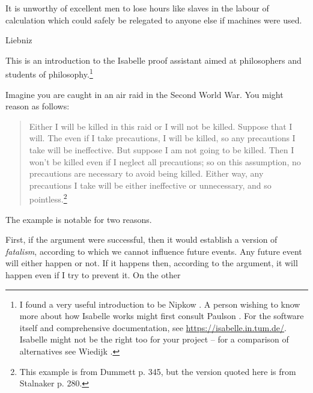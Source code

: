 %
\begin{isabellebody}%
%
%
\isadelimtheory
%
\endisadelimtheory
%
\isatagtheory
%
\endisatagtheory
{\isafoldtheory}%
%
\isadelimtheory
%
\endisadelimtheory
%
\begin{isamarkuptext}%
\epigraph{It is unworthy of excellent men to lose hours like slaves in the labour of calculation which could 
safely be relegated to anyone else if machines were used.}{Liebniz}%
\end{isamarkuptext}\isamarkuptrue%
%
\begin{isamarkuptext}%
This is an introduction to the Isabelle proof assistant aimed at philosophers and students
of philosophy.\footnote{I found a very useful introduction to be Nipkow \cite{nipkow_tutorial_2011}.
A person wishing to know more about how Isabelle works might first consult Paulson \cite{paulson_ml_1996}.
For the software itself and comprehensive documentation, see \url{https://isabelle.in.tum.de/}.
Isabelle might not be the right too for your project -- for a comparison of alternatives see
Wiedijk \cite{wiedijk_seventeen_2006}.}%
\end{isamarkuptext}\isamarkuptrue%
%
\isamarkuptrue%
%
\begin{isamarkuptext}%
Imagine you are caught in an air raid in the Second World War. You might reason as follows:
\begin{quotation}
Either I will be killed in this raid or I will not be killed. Suppose that I will. The even if I take
precautions, I will be killed, so any precautions I take will be ineffective. But suppose I am not
going to be killed. Then I won't be killed even if I neglect all precautions; so on this assumption,
no precautions are necessary to avoid being killed. Either way, any precautions I take will be either
ineffective or unnecessary, and so pointless.\footnote{This example is from Dummett \cite{dummett_bringing_1964} p. 345,
but the version quoted here is from Stalnaker \cite{stalnaker_indicative_1975} p. 280.}
\end{quotation} The example is notable for two reasons.%
\end{isamarkuptext}\isamarkuptrue%
%
\begin{isamarkuptext}%
First, if the argument were successful, then it would establish a version of \emph{fatalism},
according to which we cannot influence future events. Any future event will either happen or not. If
it happens then, according to the argument, it will happen even if I try to prevent it. On the other

\end{isamarkuptext}
\end{isabellebody}
